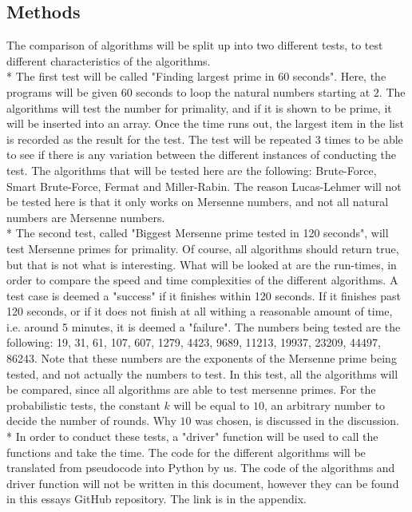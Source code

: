 \documentclass[main.tex]{subfiles}
\begin{document}
\subsection{Methods}
The comparison of algorithms will be split up into two different tests, to test different characteristics of the algorithms. 
\newline
\\*
The first test will be called "Finding largest prime in 60 seconds". Here, the programs will be given 60 seconds to loop the natural numbers starting at $2$. The algorithms will test the number for primality, and if it is shown to be prime, it will be inserted into an array. Once the time runs out, the largest item in the list is recorded as the result for the test. The test will be repeated 3 times to be able to see if there is any variation between the different instances of conducting the test. The algorithms that will be tested here are the following: Brute-Force, Smart Brute-Force, Fermat and Miller-Rabin. The reason Lucas-Lehmer will not be tested here is that it only works on Mersenne numbers, and not all natural numbers are Mersenne numbers. 
\newline
\\*
The second test, called "Biggest Mersenne prime tested in 120 seconds", will test Mersenne primes for primality. Of course, all algorithms should return true, but that is not what is interesting. What will be looked at are the run-times, in order to compare the speed and time complexities of the different algorithms. A test case is deemed a "success" if it finishes within 120 seconds. If it finishes past 120 seconds, or if it does not finish at all withing a reasonable amount of time, i.e. around 5 minutes, it is deemed a "failure". The numbers being tested are the following: 19, 31, 61, 107, 607, 1279, 4423, 9689, 11213, 19937, 23209, 44497, 86243. Note that these numbers are the exponents of the Mersenne prime being tested, and not actually the numbers to test. In this test, all the algorithms will be compared, since all algorithms are able to test mersenne primes. For the probabilistic tests, the constant $k$ will be equal to $10$, an arbitrary number to decide the number of rounds. Why $10$ was chosen, is discussed in the discussion. 
\newline
\\*
In order to conduct these tests, a "driver" function will be used to call the functions and take the time. The code for the different algorithms will be translated from pseudocode into Python by us. The code of the algorithms and driver function will not be written in this document, however they can be found in this essays GitHub repository. The link is in the appendix. 
\end{document}
